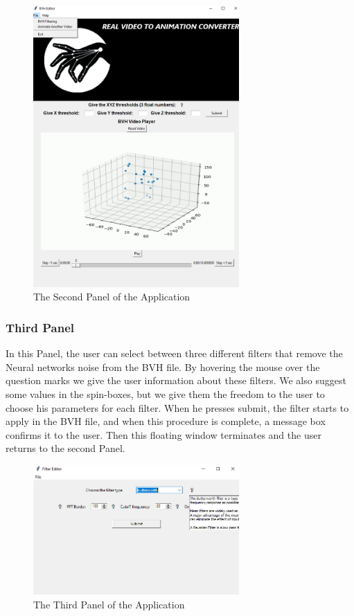 \begin{figure}[h]
	\centering
	\includegraphics[width=0.7\textwidth]{figures/Implementation/Panel2.png}
	\captionsetup{labelformat=empty}
	\caption{The Second Panel of the Application}
\end{figure}

\subsubsection*{Third Panel}
In this Panel, the user can select between three different filters that remove the Neural networks noise from the BVH file. By hovering the mouse over the question marks we give the user information about these filters. We also suggest some values in the spin-boxes, but we give them the freedom to the user to choose his parameters for each filter. When he presses submit, the filter starts to apply in the BVH file, and when this procedure is complete, a message box confirms it to the user. Then this floating window terminates and the user returns to the second Panel.

\pagebreak

\begin{figure}[h]
	\centering
	\includegraphics[width=0.7\textwidth]{figures/Implementation/Panel3.png}
	\captionsetup{labelformat=empty}
	\caption{The Third Panel of the Application}
\end{figure}

